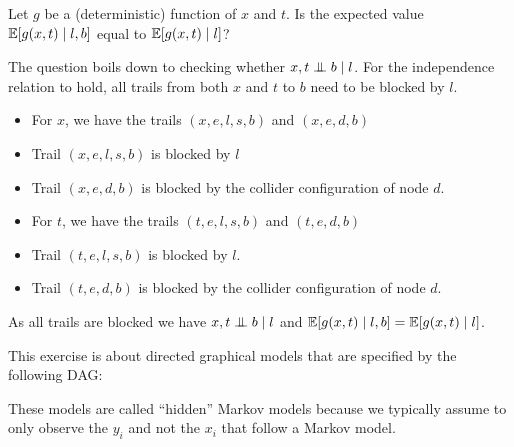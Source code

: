 \begin{exenumerate}
\begin{enumerate}
  \end{enumerate}

\item Let $g$ be a (deterministic) function of $x$ and $t$. Is the expected value $\mathbb{E}[g(x,t) \mid l,b]$ equal to $\mathbb{E}[g(x,t) \mid l]$?

  \begin{solution}
    The question boils down to checking whether $x,t \mathrel{\perp\mspace{-10mu}\perp} b \mid l$. For the independence relation to hold, all trails from both $x$ and $t$ to $b$ need to be blocked by $l$.

    \begin{itemize}
      \item For $x$, we have the trails $(x,e,l,s,b)$ and $(x,e,d,b)$
      \item Trail $(x,e,l,s,b)$ is blocked by $l$
      \item Trail $(x,e,d,b)$ is blocked by the collider configuration of node $d$.
      \item For $t$, we have the trails $(t,e,l,s,b)$ and $(t,e,d,b)$
      \item Trail $(t,e,l,s,b)$ is blocked by $l$.
      \item Trail $(t,e,d,b)$ is blocked by the collider configuration of node $d$.
    \end{itemize}
    As all trails are blocked we have $x,t \mathrel{\perp\mspace{-10mu}\perp} b \mid l$ and  $\mathbb{E}[ g(x,t) \mid l,b] = \mathbb{E}[ g(x,t) \mid l]$.
    
  \end{solution}
\end{exenumerate}


\label{ex:HMM}
This exercise is about directed graphical models that are specified by the following DAG:
\begin{center}
\end{center}
These models are called ``hidden'' Markov models because we typically assume to only observe the $y_i$ and not the $x_i$ that follow a Markov model.

